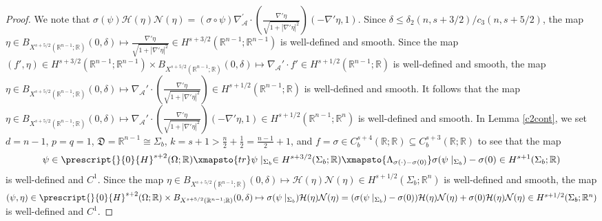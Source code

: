 \documentclass[11pt,letterpaper,reqno]{amsart}
\numberwithin{equation}{section}
\newcommand{\abs}[1]{\left\lvert#1\right\rvert}
\begin{document}
\begin{proof}
    We note that \(\sigma(\psi)\mathcal{H}(\eta)\mathcal{N}(\eta)=(\sigma \circ \psi)\nabla_{\mathcal{A}}^{'}\cdot (\frac{\nabla'\eta}{\sqrt{1+\abs{\nabla'\eta}^{2}}})(-\nabla'\eta,1)\). Since \(\delta \leq \delta_{2}(n,s+3/2)/c_{3}(n,s+5/2)\), the map \(\eta \in B_{X^{s+5/2}(\mathbb{R}^{n-1};\mathbb{R})}(0,\delta) \mapsto \frac{\nabla'\eta}{\sqrt{1+\abs{\nabla'\eta}^{2}}} \in H^{s+3/2}(\mathbb{R}^{n-1};\mathbb{R}^{n-1})\) is well-defined and smooth. Since the map \((f',\eta) \in H^{s+3/2}(\mathbb{R}^{n-1};\mathbb{R}^{n-1})\times B_{X^{s+5/2}(\mathbb{R}^{n-1};\mathbb{R})}(0,\delta) \mapsto \nabla_{\mathcal{A}}' \cdot f' \in H^{s+1/2}(\mathbb{R}^{n-1};\mathbb{R})\) is well-defined and smooth, the map \(\eta \in B_{X^{s+5/2}(\mathbb{R}^{n-1};\mathbb{R})}(0,\delta)\mapsto \nabla_{\mathcal{A}}' \cdot (\frac{\nabla'\eta}{\sqrt{1+\abs{\nabla'\eta}^{2}}}) \in H^{s+1/2}(\mathbb{R}^{n-1};\mathbb{R})\) is well-defined and smooth. It follows that the map \(\eta \in  B_{X^{s+5/2}(\mathbb{R}^{n-1};\mathbb{R})}(0,\delta) \mapsto \nabla_{\mathcal{A}}'\cdot(\frac{\nabla'\eta}{\sqrt{1+\abs{\nabla'\eta}^{2}}})(-\nabla'\eta,1) \in H^{s+1/2}(\mathbb{R}^{n-1};\mathbb{R}^{n})\) is well-defined and smooth. In Lemma \ref{c2cont}, we set \(d=n-1\), \(p=q=1\), \(\mathfrak{D}=\mathbb{R}^{n-1}\cong \Sigma_{b}\), \(k=s+1>\frac{n}{2}+\frac{1}{2}=\frac{n-1}{2}+1\), and \(f=\sigma\in C_{b}^{s+4}(\mathbb{R};\mathbb{R})\subseteq C_{b}^{s+3}(\mathbb{R};\mathbb{R})\) to see that the map
    \begin{align}
        \psi \in \prescript{}{0}{H}^{s+2}(\Omega;\mathbb{R}) \xmapsto{tr} \psi \mid_{\Sigma_{b}} \in H^{s+3/2}(\Sigma_{b};\mathbb{R}) \xmapsto{\Lambda_{\sigma(\cdot)-\sigma(0)}} \sigma(\psi \mid_{\Sigma_{b}})-\sigma(0) \in H^{s+1}(\Sigma_{b};\mathbb{R})
    \end{align}
    is well-defined and \(C^{1}\). Since the map \(\eta \in B_{X^{s+5/2}(\mathbb{R}^{n-1};\mathbb{R})}(0,\delta) \mapsto \mathcal{H}(\eta)\mathcal{N}(\eta) \in H^{s+1/2}(\Sigma_{b};\mathbb{R}^{n})\) is well-defined and smooth, the map \((\psi,\eta) \in \prescript{}{0}{H}^{s+2}(\Omega;\mathbb{R}) \times B_{X^{s+5/2}(\mathbb{R}^{n-1};\mathbb{R})}(0,\delta) \mapsto \sigma(\psi \mid_{\Sigma_{b}})\mathcal{H}(\eta)\mathcal{N}(\eta)=(\sigma(\psi \mid_{\Sigma_{b}})-\sigma(0))\mathcal{H}(\eta)\mathcal{N}(\eta)+\sigma(0)\mathcal{H}(\eta)\mathcal{N}(\eta) \in H^{s+1/2}(\Sigma_{b};\mathbb{R}^{n})\) is well-defined and \(C^{1}\).


\end{proof}
\end{document}

